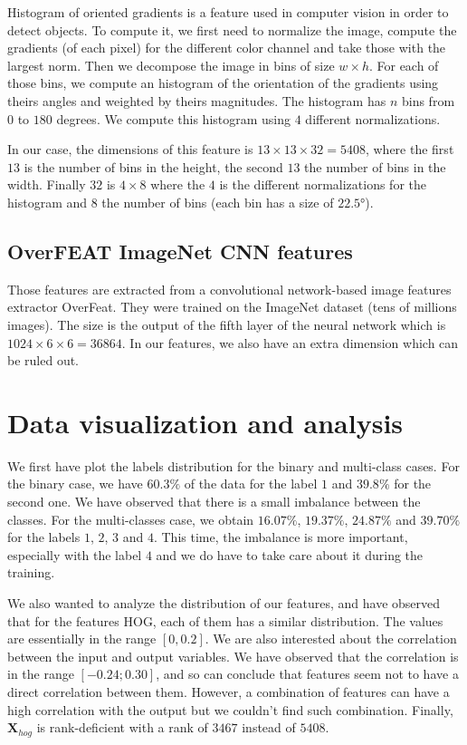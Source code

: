 \documentclass{article} %
\begin{document}
Histogram of oriented gradients is a feature used in computer vision in order to detect objects. To compute it, we first need to normalize the image, compute the gradients (of each pixel) for the different color channel and take those with the largest norm. Then we decompose the image in bins of size $w \times h$. For each of those bins, we compute an histogram of the orientation of the gradients using theirs angles and weighted by theirs magnitudes. The histogram has $n$ bins from $0$ to $180$ degrees. We compute this histogram using $4$ different normalizations.

In our case, the dimensions of this feature is $13 \times 13 \times 32=5408$, where the first $13$ is the number of bins in the height, the second $13$ the number of bins in the width. Finally $32$ is $4 \times 8$ where the $4$ is the different normalizations for the histogram and $8$ the number of bins (each bin has a size of $22.5°$). 

\subsection{OverFEAT ImageNet CNN features}

Those features are extracted from a convolutional network-based image features extractor OverFeat. They were trained on the ImageNet dataset (tens of millions images). The size is the output of the fifth layer of the neural network which is $1024 \times 6 \times 6 = 36864$. In our features, we also have an extra dimension which can be ruled out.

\section{Data visualization and analysis}

We first have plot the labels distribution for the binary and multi-class cases. For the binary case, we have $60.3\%$ of the data for the label $1$ and $39.8\%$ for the second one. We have observed that there is a small imbalance between the classes. For the multi-classes case, we obtain $16.07\%$, $19.37\%$, $24.87\%$ and $39.70\%$ for the labels $1$, $2$, $3$ and $4$. This time, the imbalance is more important, especially with the label $4$ and we do have to take care about it during the training.

We also wanted to analyze the distribution of our features, and have observed that for the features HOG, each of them has a similar distribution. The values are essentially in the range $[0, 0.2]$. We are also interested about the correlation between the input and output variables. We have observed that the correlation is in the range $[-0.24 ;0.30]$, and so can conclude that features seem not to have a direct correlation between them. However, a combination of features can have a high correlation with the output but we couldn't find such combination. Finally, $\mathbf{X}_{hog}$ is rank-deficient with a rank of $3467$ instead of $5408$.
\end{document}
